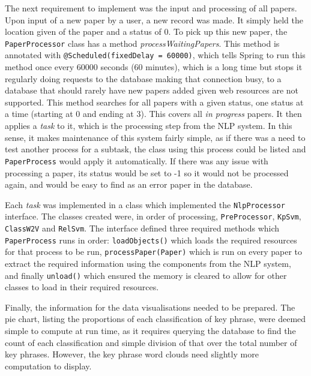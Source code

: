 The next requirement to implement was the input and processing of all papers. Upon input of a new paper by a user, a new  record was made. It simply held the location given of the paper and a status of 0. To pick up this new paper, the \texttt{PaperProcessor} class has a method \textit{processWaitingPapers}. This method is annotated with \texttt{@Scheduled(fixedDelay = 60000)}, which tells Spring to run this method once every 60000 seconds (60 minutes), which is a long time but stops it regularly doing requests to the database making that connection busy, to a database that should rarely have new papers added given web resources are not supported. This method searches for all papers with a given status, one status at a time (starting at 0 and ending at 3). This covers all \textit{in progress} papers. It then applies a \textit{task} to it, which is the processing step from the NLP system. In this sense, it makes maintenance of this system fairly simple, as if there was a need to test another process for a subtask, the class using this process could be listed and \texttt{PaperProcess} would apply it automatically. If there was any issue with processing a paper, its status would be set to -1 so it would not be processed again, and would be easy to find as an error paper in the database.

Each \textit{task} was implemented in a class which implemented the \texttt{NlpProcessor} interface. The classes created were, in order of processing, \texttt{PreProcessor}, \texttt{KpSvm}, \texttt{ClassW2V} and \texttt{RelSvm}. The interface defined three required methods which \texttt{PaperProcess} runs in order: \texttt{loadObjects()} which loads the required resources for that process to be run, \texttt{processPaper(Paper)} which is run on every paper to extract the required information using the components from the NLP system, and finally \texttt{unload()} which ensured the memory is cleared to allow for other classes to load in their required resources.


Finally, the information for the data visualisations needed to be prepared. The pie chart, listing the proportions of each classification of key phrase, were deemed simple to compute at run time, as it requires querying the database to find the count of each classification and simple division of that over the total number of key phrases. However, the key phrase word clouds need slightly more computation to display.

